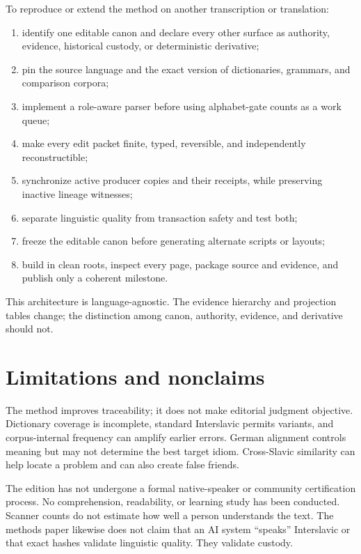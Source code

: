 \documentclass[11pt,a4paper]{article}
\begin{document}
To reproduce or extend the method on another transcription or translation:

\begin{enumerate}
  \item identify one editable canon and declare every other surface as authority, evidence, historical custody, or deterministic derivative;
  \item pin the source language and the exact version of dictionaries, grammars, and comparison corpora;
  \item implement a role-aware parser before using alphabet-gate counts as a work queue;
  \item make every edit packet finite, typed, reversible, and independently reconstructible;
  \item synchronize active producer copies and their receipts, while preserving inactive lineage witnesses;
  \item separate linguistic quality from transaction safety and test both;
  \item freeze the editable canon before generating alternate scripts or layouts;
  \item build in clean roots, inspect every page, package source and evidence, and publish only a coherent milestone.
\end{enumerate}

This architecture is language-agnostic. The evidence hierarchy and projection tables change; the distinction among canon, authority, evidence, and derivative should not.

\section{Limitations and nonclaims}

The method improves traceability; it does not make editorial judgment objective. Dictionary coverage is incomplete, standard Interslavic permits variants, and corpus-internal frequency can amplify earlier errors. German alignment controls meaning but may not determine the best target idiom. Cross-Slavic similarity can help locate a problem and can also create false friends.

The edition has not undergone a formal native-speaker or community certification process. No comprehension, readability, or learning study has been conducted. Scanner counts do not estimate how well a person understands the text. The methods paper likewise does not claim that an AI system ``speaks'' Interslavic or that exact hashes validate linguistic quality. They validate custody.
\end{document}
